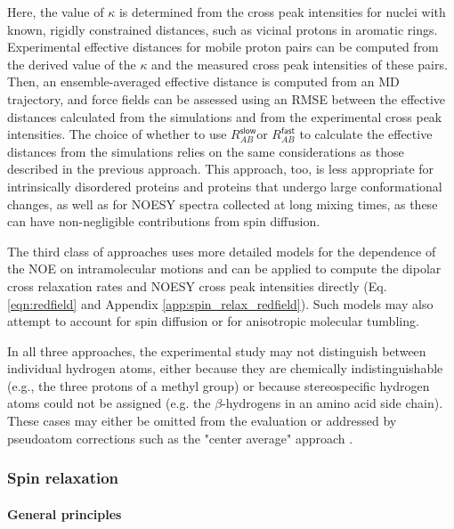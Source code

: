 \documentclass[9pt,review,pubversion]{livecoms}
\begin{document}
Here, the value of $\kappa$ is determined from the cross peak intensities for nuclei with known, rigidly constrained distances, such as vicinal protons in aromatic rings.
Experimental effective distances for mobile proton pairs can be computed from the derived value of the $\kappa$ and the measured cross peak intensities of these pairs.
Then, an ensemble-averaged effective distance is computed from an MD trajectory, and force fields can be assessed using an RMSE between the effective distances calculated from the simulations and from the experimental cross peak intensities.
The choice of whether to use $R_{AB}^{\mathsf{slow}}$or $R_{AB}^{\mathsf{fast}}$ to calculate the effective distances from the simulations relies on the same considerations as those described in the previous approach.
This approach, too, is less appropriate for intrinsically disordered proteins and  proteins that undergo large conformational changes, as well as for NOESY spectra collected at long mixing times, as these can have non-negligible contributions from spin diffusion.

The third class of approaches uses more detailed models for the dependence of the NOE on intramolecular motions \cite{peter_calculation_2001,vogeli_nuclear_2014} and can be applied to compute the dipolar cross relaxation rates and NOESY cross peak intensities directly (Eq. \ref{eqn:redfield} and Appendix \ref{app:spin_relax_redfield}).
Such models may also attempt to account for spin diffusion or for anisotropic molecular tumbling.

In all three approaches, the experimental study may not distinguish between individual hydrogen atoms, either because they are chemically indistinguishable (e.g., the three protons of a methyl group) or because stereospecific hydrogen atoms could not be assigned (e.g. the $\beta$-hydrogens in an amino acid side chain).
These cases may either be omitted from the evaluation or addressed by pseudoatom corrections such as the "center average" approach \cite{wuthrich_pseudo-structures_1983,fletcher_treatment_1996}.

\subsubsection{Spin relaxation}
\label{sub2:spin_relax}

\paragraph{General principles}
\end{document}
